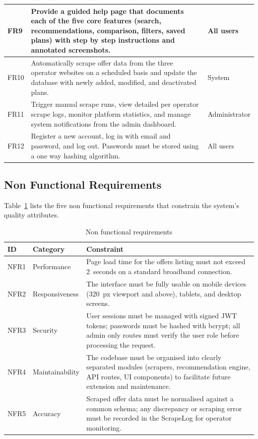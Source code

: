 {\begin{longtable}{|p{1.2cm}|p{9.5cm}|p{3.2cm}|}
    \hline
    FR9 & Provide a guided help page that documents each of the five core features (search, recommendations, comparison, filters, saved plans) with step by step instructions and annotated screenshots. & All users \\
    \hline
    FR10 & Automatically scrape offer data from the three operator websites on a scheduled basis and update the database with newly added, modified, and deactivated plans. & System \\
    \hline
    FR11 & Trigger manual scrape runs, view detailed per operator scrape logs, monitor platform statistics, and manage system notifications from the admin dashboard. & Administrator \\
    \hline
    FR12 & Register a new account, log in with email and password, and log out. Passwords must be stored using a one way hashing algorithm. & All users \\
    \hline
\end{longtable}
}

\subsection{Non Functional Requirements}

Table~\ref{tab:nfr} lists the five non functional requirements that constrain the system's quality attributes.

\begin{table}[H]
  \caption{Non functional requirements}
  \label{tab:nfr}
  \centering\small
  \begin{tabular}{|p{1.3cm}|p{2.8cm}|p{9.9cm}|}
    \hline
    \textbf{ID} & \textbf{Category} & \textbf{Constraint} \\
    \hline
    NFR1 & Performance    & Page load time for the offers listing must not exceed 2~seconds on a standard broadband connection. \\
    \hline
    NFR2 & Responsiveness & The interface must be fully usable on mobile devices (320~px viewport and above), tablets, and desktop screens. \\
    \hline
    NFR3 & Security       & User sessions must be managed with signed JWT tokens; passwords must be hashed with bcrypt; all admin only routes must verify the user role before processing the request. \\
    \hline
    NFR4 & Maintainability & The codebase must be organised into clearly separated modules (scrapers, recommendation engine, API routes, UI components) to facilitate future extension and maintenance. \\
    \hline
    NFR5 & Accuracy       & Scraped offer data must be normalised against a common schema; any discrepancy or scraping error must be recorded in the ScrapeLog for operator monitoring. \\
    \hline
  \end{tabular}
\end{table}

